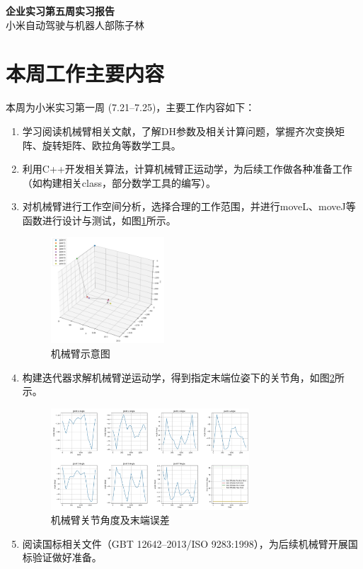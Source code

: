 \documentclass{ctexart}
\begin{document}
\begin{center}
    \LARGE \textbf{企业实习\;第五周实习报告}\\
    \vspace{10pt}
    \normalsize 小米自动驾驶与机器人部\;\;陈子林
\end{center}

\section{本周工作主要内容}

本周为小米实习第一周 (7.21--7.25)，主要工作内容如下：

\begin{enumerate}
    \item 学习阅读机械臂相关文献，了解DH参数及相关计算问题，掌握齐次变换矩阵、旋转矩阵、欧拉角等数学工具。
    \item 利用C++开发相关算法，计算机械臂正运动学，为后续工作做各种准备工作（如构建相关class，部分数学工具的编写）。
    \item 对机械臂进行工作空间分析，选择合理的工作范围，并进行moveL、moveJ等函数进行设计与测试，如图\ref{demo}所示。
    \begin{figure}[H]
        \centering
        \includegraphics[width = 0.4\textwidth]{figure2.jpg}
        \caption{机械臂示意图}\label{demo}
    \end{figure}
    \item 构建迭代器求解机械臂逆运动学，得到指定末端位姿下的关节角，如图\ref{joint}所示。
    \begin{figure}[H]
        \centering
        \includegraphics[width = 0.7\textwidth]{figure1.jpg}
        \caption{机械臂关节角度及末端误差}\label{joint}
    \end{figure}
    \item 阅读国标相关文件（GBT 12642--2013/ISO 9283:1998），为后续机械臂开展国标验证做好准备。
    
\end{enumerate}
\end{document}
